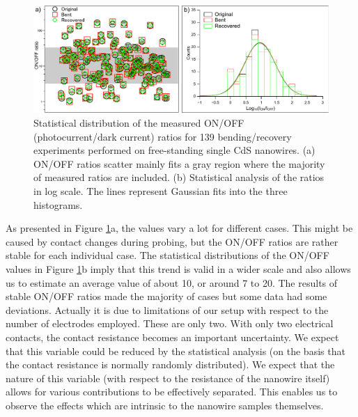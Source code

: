 \begin{figure}  
\includegraphics[width=\textwidth]{figures/figure6_3}
\caption[Statistical distribution of ON/OFF ratios]
{Statistical distribution of the measured ON/OFF (photocurrent/dark current) ratios for 139 bending/recovery experiments performed on free-standing single CdS nanowires. (a) ON/OFF ratios scatter mainly fits a gray region where the majority of measured ratios are included. (b) Statistical analysis of the ratios in log  scale. The lines represent Gaussian fits into the three histograms.
\label{fig:6_3}}
\end{figure}

As presented in Figure \ref{fig:6_3}a, the values vary a lot for different cases. This might be caused by contact changes during probing, but the ON/OFF ratios are rather stable for each individual case. 
The statistical distributions of the ON/OFF values in Figure \ref{fig:6_3}b imply that this trend is valid in a wider scale and also allows us to estimate an average value of about 10, or around 7 to 20. 
The results of stable ON/OFF ratios made the majority of cases but some data had some deviations. 
Actually it is due to limitations of our setup with respect to the number of electrodes employed. These are only two. 
With only two electrical contacts, the contact resistance becomes an important uncertainty.\cite{Hummelgard2011} 
We expect that this variable could be reduced by the statistical analysis (on the basis that the contact resistance is normally randomly distributed). 
We expect that the nature of this variable (with respect to the resistance of the nanowire itself) allows for various contributions to be effectively separated. This enables us to observe the effects which are intrinsic to the nanowire samples themselves.

